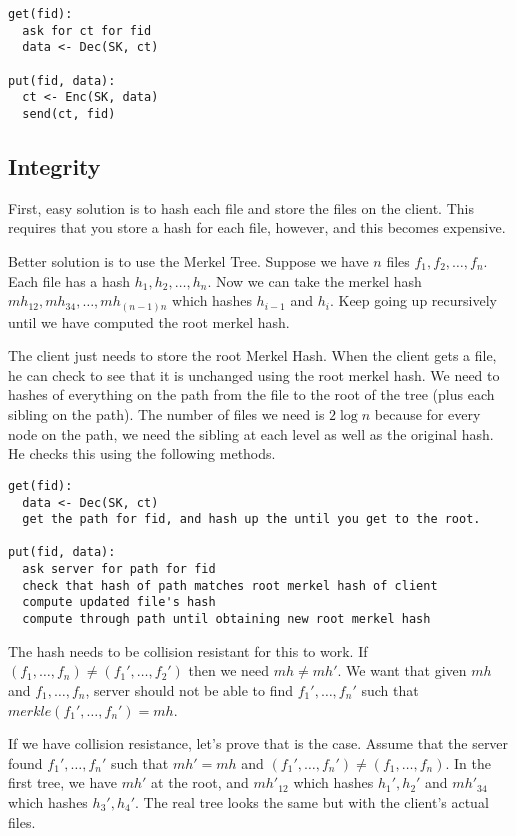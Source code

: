 \documentclass[psamsfonts]{amsart}
\begin{document}
\begin{verbatim}
get(fid):
  ask for ct for fid
  data <- Dec(SK, ct)

put(fid, data):
  ct <- Enc(SK, data)
  send(ct, fid)
\end{verbatim}

\subsection{Integrity}

First, easy solution is to hash each file and store the files on the client. This requires that you store a hash for each file, however, and this becomes expensive.

Better solution is to use the Merkel Tree. Suppose we have $n$ files $f_1, f_2, \ldots, f_n$. Each file has a hash $h_1, h_2, \ldots, h_n$. Now we can take the merkel hash $mh_{12}, mh_{34}, \ldots, mh_{(n-1)n}$ which hashes $h_{i-1}$ and $h_{i}$. Keep going up recursively until we have computed the root merkel hash.

The client just needs to store the root Merkel Hash. When the client gets a file, he can check to see that it is unchanged using the root merkel hash. We need to hashes of everything on the path from the file to the root of the tree (plus each sibling on the path). The number of files we need is $2 \log n$ because for every node on the path, we need the sibling at each level as well as the original hash. He checks this using the following methods. 

\begin{verbatim}
get(fid):
  data <- Dec(SK, ct)
  get the path for fid, and hash up the until you get to the root.

put(fid, data):
  ask server for path for fid
  check that hash of path matches root merkel hash of client
  compute updated file's hash
  compute through path until obtaining new root merkel hash
\end{verbatim}

The hash needs to be collision resistant for this to work. If $(f_1, \ldots, f_n) \neq (f_1', \ldots, f_2')$ then we need $mh \neq mh'$. We want that given $mh$ and $f_1, \ldots, f_n$, server should not be able to find $f_1', \ldots, f_n'$ such that $merkle(f_1', \ldots, f_n') = mh$.

If we have collision resistance, let's prove that is the case. Assume that the server found $f_1', \ldots, f_n'$ such that $mh' = mh$ and $(f_1', \ldots, f_n') \neq (f_1, \ldots, f_n)$. In the first tree, we have $mh'$ at the root, and $mh'_{12}$ which hashes $h_1', h_2'$ and $mh'_{34}$ which hashes $h_3', h_4'$. The real tree looks the same but with the client's actual files. 
\end{document}
